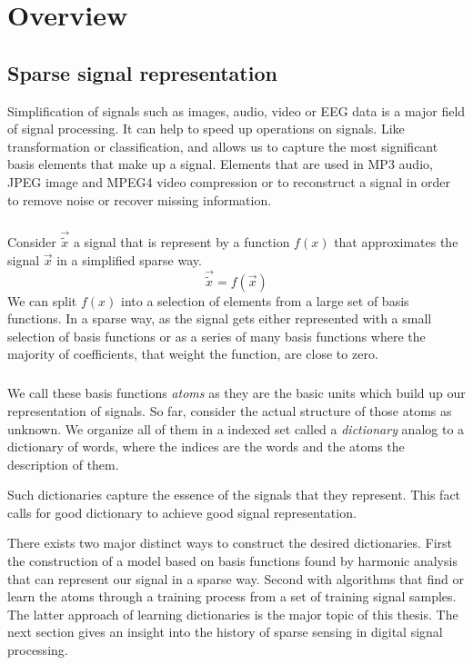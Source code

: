\chapter{Overview}

\section{Sparse signal representation}
\label{sec:dicts}
Simplification of signals such as images, audio, video or EEG data is a major
field of signal processing. It can help to speed up operations on signals. Like
transformation or classification, and allows us to capture the most
significant basis elements that make up a signal. Elements that are
used in MP3 audio, JPEG image and MPEG4 video compression or to reconstruct
a signal in order to remove noise or recover missing information.

\paragraph{}
Consider $\vec{\tilde{x}}$ a signal that is represent by a function $f(x)$ that
approximates the signal $\vec{x}$ in a simplified sparse way.
\begin{equation*}
\vec{\tilde{x}} = f\left(\vec{x}\right)
\end{equation*}
We can split $f(x)$ into a selection of elements from a large set of
basis functions. In a sparse way, as the signal gets either represented with
a small selection of basis functions or as a series of many basis
functions where the majority of coefficients, that weight the function, are
close to zero. 

\paragraph{}
We call these basis functions \emph{atoms} as they are the basic units
which build up our representation of signals. So far, consider the actual
structure of those atoms as unknown. We organize all of them in a
indexed set called a \emph{dictionary} analog to a dictionary of words, where
the indices are the words and the atoms the description of them. 

Such dictionaries capture the essence of the signals that they represent.
This fact calls for good dictionary to achieve good signal representation.

There exists two major distinct ways to construct the desired dictionaries. 
First the construction of a model based on basis functions found by harmonic
analysis that can represent our signal in a sparse way. Second with
algorithms that find or learn the atoms through a training process from a set of
training signal samples. The latter approach of learning dictionaries is the
major topic of this thesis. The next section gives an insight into the history
of sparse sensing in digital signal processing. 




